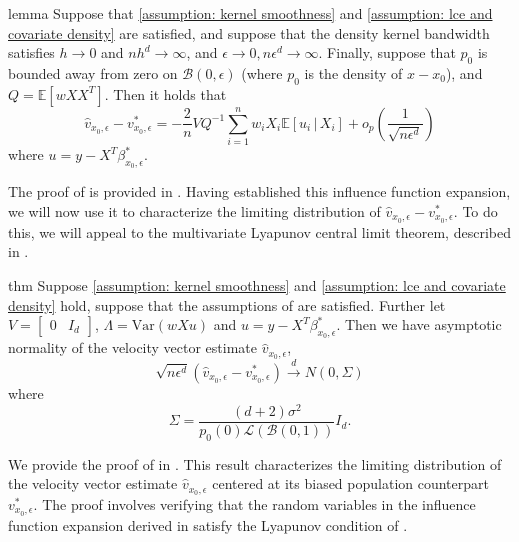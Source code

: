 \documentclass[11pt]{article}
\begin{document}
\begin{restatable}{lemma}{} \label{thm: decomposition for beta}
    Suppose that \cref{assumption: kernel smoothness} and \cref{assumption: lce and covariate density} are satisfied, and suppose that the density kernel bandwidth satisfies $h \rightarrow 0$ and $nh^d \rightarrow \infty$, and $\epsilon \rightarrow 0, n\epsilon^d \rightarrow \infty$. Finally, suppose that $p_0$ is bounded away from zero on $\mathcal{B}(0, \epsilon)$ (where $p_0$ is the density of $x - x_0$), and $Q = \mathbb{E}[wXX^T]$. Then it holds that
    \[\hat{v}_{x_0, \epsilon} - v^*_{x_0, \epsilon} = -\frac{2}{n}VQ^{-1}\sum_{i = 1}^nw_iX_i\mathbb{E}[u_i\,|\,X_i] +o_p\left(\frac{1}{\sqrt{n\epsilon^{d}}}\right)\]
    where $u = y - X^T\beta_{x_0, \epsilon}^*$.
\end{restatable}
The proof of  is provided in . Having established this influence function expansion, we will now use it to characterize the limiting distribution of $\hat{v}_{x_0, \epsilon} - v^*_{x_0, \epsilon}.$ To do this, we will appeal to the multivariate Lyapunov central limit theorem, described in .

\begin{restatable}{thm}{} \label{corr: central limit for v}
    Suppose \cref{assumption: kernel smoothness} and \cref{assumption: lce and covariate density} hold, suppose that the assumptions of  are satisfied. Further let $V = \begin{bmatrix}
        0 & I_d
    \end{bmatrix}$, $\Lambda = \text{Var}(wXu)$ and $u = y - X^T\beta_{x_0, \epsilon}^*$. Then we have asymptotic normality of the velocity vector estimate $\hat{v}_{x_0, \epsilon}$,
    \[\sqrt{n\epsilon^{d}}(\hat{v}_{x_0, \epsilon} - v^*_{x_0, \epsilon}) \overset{d}{\rightarrow}N(0, \Sigma)\]
    where 
    \[\Sigma = \frac{(d+2)\sigma^2}{p_0(0)\mathcal{L}(\mathcal{B}(0,1))} I_d.\]
\end{restatable}
We provide the proof of  in . This result characterizes the limiting distribution of the velocity vector estimate $\hat v_{x_0, \epsilon}$ centered at its biased population counterpart $v^*_{x_0, \epsilon}$. The proof involves verifying that the random variables in the influence function expansion derived in  satisfy the Lyapunov condition of .
\end{document}
